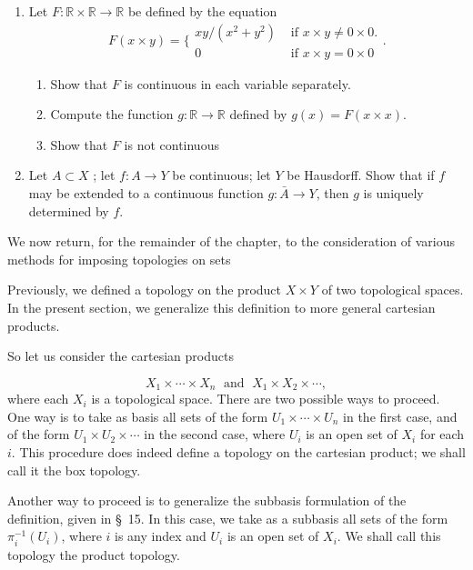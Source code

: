 \begin{enumerate}[itemsep=0.4em, parsep=0pt, topsep=0pt, partopsep=0pt, leftmargin=*, label=\arabic*., ref=\arabic*]
\item Let \(F : \mathbb{R} \times \mathbb{R} \rightarrow \mathbb{R}\) be defined by the equation \[ F( {x \times y}) = \{ \begin{array}{ll} {xy}/( {x^{2} + y^{2}}) & \text{ if }x \times y \neq 0 \times 0. \\ 0 & \text{ if }x \times y = 0 \times 0 \end{array}. \]
  \begin{enumerate}[itemsep=0.2em, parsep=0pt, topsep=0pt, partopsep=0pt, leftmargin=*, label=(\alph*), align=left]
  \item Show that \(F\) is continuous in each variable separately.
  \item Compute the function \(g : \mathbb{R} \rightarrow \mathbb{R}\) defined by \(g(x) = F( {x \times x})\).
  \item Show that \(F\) is not continuous
  \end{enumerate}
\item Let \(A \subset X\) ; let \(f : A \rightarrow Y\) be continuous; let \(Y\) be Hausdorff. Show that if \(f\) may be extended to a continuous function \(g : \bar{A} \rightarrow Y\), then \(g\) is uniquely determined by \(f\).
\end{enumerate}


We now return, for the remainder of the chapter, to the consideration of various methods for imposing topologies on sets

Previously, we defined a topology on the product \(X \times Y\) of two topological spaces. In the present section, we generalize this definition to more general cartesian products.

So let us consider the cartesian products

\[
X_{1} \times \cdots \times {X}_{n}\;\text{ and }\;X_{1} \times {X}_{2} \times \cdots,
\]
where each \(X_{i}\) is a topological space. There are two possible ways to proceed. One way is to take as basis all sets of the form \(U_{1} \times \cdots \times {U}_{n}\) in the first case, and of the form \(U_{1} \times {U}_{2} \times \cdots\) in the second case, where \(U_{i}\) is an open set of \(X_{i}\) for each \(i\). This procedure does indeed define a topology on the cartesian product; we shall call it the box topology.

Another way to proceed is to generalize the subbasis formulation of the definition, given in \S\ 15. In this case, we take as a subbasis all sets of the form \({\pi }_i^{-1}( U_{i})\), where \(i\) is any index and \(U_{i}\) is an open set of \(X_{i}\). We shall call this topology the product topology.

